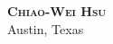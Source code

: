 
\begin{center}
  \textbf{\Huge \scshape Chiao-Wei Hsu} \\ 
  \vspace{5pt plus 2pt minus 2pt} \small \faMapMarker* Austin, Texas
\end{center}